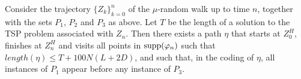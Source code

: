 %	
\begin{lem}
Consider the trajectory $\{Z_k\}_{k=0}^n$ of the $\mu$-random walk up to time $n$, together with the sets $P_1$, $P_2$ and $P_3$ as above.
Let $T$ be the length of a solution to the TSP problem associated with $Z_n$. Then there exists a path $\eta$ that starts at $Z^H_0$, finishes at $Z^H_n$ and visits all points in $\mathrm{supp}(\varphi_n)$ such that $length(\eta)\le T+100 N (L+2D)$, and such that, in the coding of $\eta$, all instances of $P_1$ appear before any instance of $P_3$.
\end{lem}
